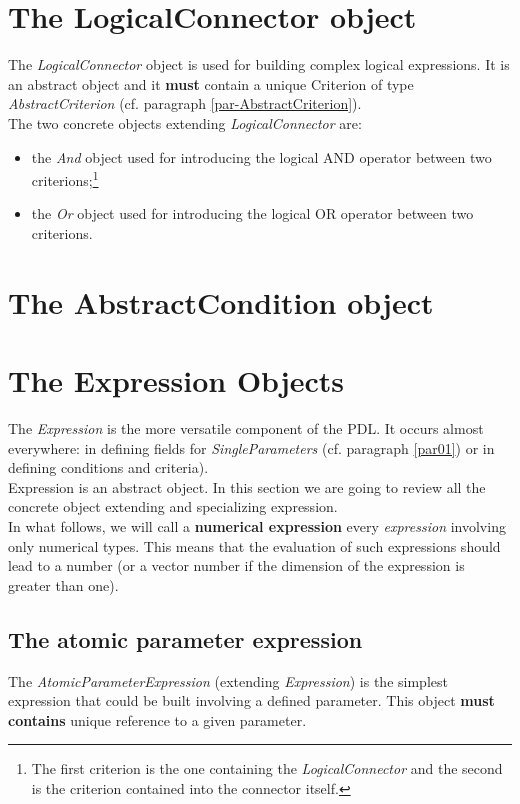 \documentclass[a4paper,11pt] {article}
\begin{document}
\section{The LogicalConnector object}\label{par-LogicalConnector}
The {\it LogicalConnector} object is used for building complex logical expressions. It is an abstract object and it {\bf must} contain a unique Criterion of type {\it AbstractCriterion} (cf. paragraph \ref{par-AbstractCriterion}).\\
The two concrete objects extending {\it LogicalConnector} are:
\begin{itemize}
\item the {\it And} object used for introducing the logical AND operator between two criterions;\footnote{The first criterion is the one containing the {\it LogicalConnector} and the second is the criterion contained into the connector itself.}
\item the {\it Or} object used for introducing the logical OR operator between two criterions.
\end{itemize}

\section{The AbstractCondition object}\label{par-ConditionType}
 
 
\section{The Expression Objects}\label{par02}
The {\it Expression} is the more versatile component of the PDL. It occurs almost everywhere: in defining fields for {\it SingleParameters} (cf. paragraph \ref{par01}) or in defining conditions and criteria).\\
Expression is an abstract object. In this section we are going to review all the concrete object extending and specializing expression.\\

 In what follows, we will call a {\bf numerical expression} every {\it expression} involving only numerical types. This means that the evaluation of such expressions should lead to a number (or a vector number if the dimension of the expression is greater than one).\\


\subsection{The atomic parameter expression}\label{par02_01}
The {\it AtomicParameterExpression} (extending {\it Expression}) is the simplest expression that could be built involving a defined parameter. This object {\bf must contains} unique reference to a given parameter.\\
\end{document}
